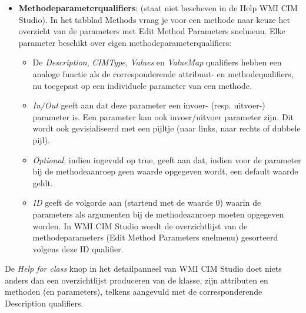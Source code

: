 \documentclass[11pt,a4paper]{report}
\begin{document}
\begin{itemize}
	\item \textbf{Methodeparameterqualifiers}: (staat niet bescheven in de Help WMI CIM Studio). In het tabblad Methods vraag je voor een methode naar keuze het overzicht van de parameters met Edit Method Parameters snelmenu. Elke parameter beschikt over eigen methodeparameterqualifiers:
	\begin{itemize}
		\item De \textit{Description}, \textit{CIMType}, \textit{Values} en \textit{ValueMap} qualifiers hebben een analoge functie als de corresponderende attribuut- en methodequalifiers, nu toegepast op een individuele parameter van een methode.
		\item \textit{In/Out} geeft aan dat deze parameter een invoer- (resp. uitvoer-) parameter is. Een parameter kan ook invoer/uitvoer parameter zijn. Dit wordt ook gevisialiseerd met een pijltje (naar links, naar rechts of dubbele pijl).
		\item \textit{Optional}, indien ingevuld op true, geeft aan dat, indien voor de parameter bij de methodeaanroep geen waarde opgegeven wordt, een default waarde geldt.
		\item \textit{ID} geeft de volgorde aan (startend met de waarde 0) waarin de parameters als argumenten bij de methodeaanroep moeten opgegeven worden. In WMI CIM Studio wordt de overzichtlijst van de methodeparameters (Edit Method Parameters snelmenu) gesorteerd volgens deze ID qualifier.
	\end{itemize}
\end{itemize}
De \textit{Help for class} knop in het detailpanneel van WMI CIM Studio doet niets anders dan een overzichtlijst produceren van de klasse, zijn attributen en methoden (en parameters), telkens aangevuld met de corresponderende Description qualifiers.
\end{document}
